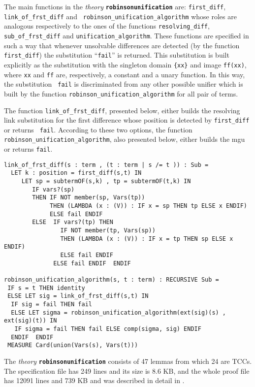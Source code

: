 \documentclass[submission,copyright,creativecommons]{eptcs}
\begin{document}
The main functions in the \emph{theory} {\tt \bf robinsonunification}
are: {\tt first\_diff}, {\tt link\_of\_frst\_diff} and {\tt
  robinson\_unification\_algorithm} whose roles are analogous
respectively to the ones of the functions {\tt resolving\_diff}, {\tt
  sub\_of\_frst\_diff} and {\tt unification\_algorithm}.  These
functions are specified in such a way that whenever unsolvable
differences are detected (by the function {\tt first\_diff}) the
substitution ``{\tt fail}'' is returned. This substitution is built
explicitly as the substitution with the singleton domain {\tt \{xx\}}
and image {\tt ff(xx)}, where {\tt xx} and {\tt ff} are, respectively,
a constant and a unary function. In this way, the substitution {\tt
  fail} is discriminated from any other possible unifier which is
built by the function {\tt robinson\_unification\_algorithm} for all
pair of terms.

The function {\tt link\_of\_frst\_diff}, presented below, either
builds the resolving link substitution for the first difference whose
position is detected by {\tt first\_diff} or returns {\tt
  fail}. According to these two options, the function {\tt
  robinson\_unification\_algorithm}, also presented below, either
builds the mgu or returns {\tt fail}.

{\small
\begin{verbatim}
link_of_frst_diff(s : term , (t : term | s /= t )) : Sub =
  LET k : position = first_diff(s,t) IN
     LET sp = subtermOF(s,k) , tp = subtermOF(t,k) IN 
        IF vars?(sp) 
        THEN IF NOT member(sp, Vars(tp))
             THEN (LAMBDA (x : (V)) : IF x = sp THEN tp ELSE x ENDIF)
             ELSE fail ENDIF 
        ELSE  IF vars?(tp) THEN 
                IF NOT member(tp, Vars(sp))
                THEN (LAMBDA (x : (V)) : IF x = tp THEN sp ELSE x ENDIF)
                ELSE fail ENDIF           
              ELSE fail ENDIF  ENDIF

robinson_unification_algorithm(s, t : term) : RECURSIVE Sub =
 IF s = t THEN identity  
 ELSE LET sig = link_of_frst_diff(s,t) IN
  IF sig = fail THEN fail
  ELSE LET sigma = robinson_unification_algorithm(ext(sig)(s) , ext(sig)(t)) IN
   IF sigma = fail THEN fail ELSE comp(sigma, sig) ENDIF
  ENDIF  ENDIF
 MEASURE Card(union(Vars(s), Vars(t)))
\end{verbatim}
}

The \emph{theory} {\tt \bf robinsonunification} consists of 47 lemmas
from which 24 are TCCs.  The specification file has 249 lines and its
size is 8.6 KB, and the whole proof file has 12091 lines and 739 KB
and was described in detail in \cite{AMARG2010}.
\end{document}
